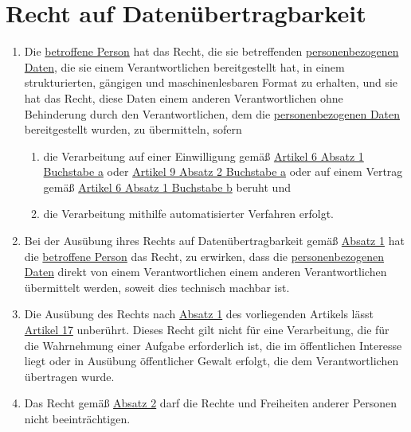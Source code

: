 \chapter{Recht auf Datenübertragbarkeit}
\label{ch:20}


\begin{enumerate}

  \item Die \hyperref[itm:04-1]{betroffene Person} hat das Recht, die sie betreffenden \hyperref[itm:04-1]{personenbezogenen Daten}, die sie einem
   Verantwortlichen bereitgestellt hat, in einem strukturierten, gängigen und maschinenlesbaren Format zu erhalten, und
   sie hat das Recht, diese Daten einem anderen Verantwortlichen ohne Behinderung durch den Verantwortlichen, dem die
   \hyperref[itm:04-1]{personenbezogenen Daten} bereitgestellt wurden, zu übermitteln, sofern
  \label{itm:20-1}

  \begin{enumerate}
  
    \item die Verarbeitung auf einer Einwilligung gemäß \hyperref[itm:06-1a]{Artikel 6 Absatz 1 Buchstabe a} oder
    \hyperref[itm:09-2a]{Artikel 9 Absatz 2 Buchstabe a} oder auf einem Vertrag gemäß \hyperref[itm:06-1b]{Artikel 6
     Absatz 1 Buchstabe b} beruht und
  \label{itm:20-1a}

    \item die Verarbeitung mithilfe automatisierter Verfahren erfolgt.
  \label{itm:20-1b}

  \end{enumerate}

  \item Bei der Ausübung ihres Rechts auf Datenübertragbarkeit gemäß \hyperref[itm:20-1]{Absatz 1} hat die \hyperref[itm:04-1]{betroffene
   Person} das Recht, zu erwirken, dass die \hyperref[itm:04-1]{personenbezogenen Daten} direkt von einem Verantwortlichen einem anderen
   Verantwortlichen übermittelt werden, soweit dies technisch machbar ist.
  \label{itm:20-2}

  \item Die Ausübung des Rechts nach \hyperref[itm:20-1]{Absatz 1} des vorliegenden Artikels lässt \hyperref[ch:17]
   {Artikel 17} unberührt. Dieses Recht gilt nicht für eine Verarbeitung, die für die Wahrnehmung einer Aufgabe
   erforderlich ist, die im öffentlichen Interesse liegt oder in Ausübung öffentlicher Gewalt erfolgt, die dem
   Verantwortlichen übertragen wurde.
  \label{itm:20-3}

  \item Das Recht gemäß \hyperref[itm:20-2]{Absatz 2} darf die Rechte und Freiheiten anderer Personen nicht
   beeinträchtigen.
  \label{itm:20-4}

\end{enumerate}


